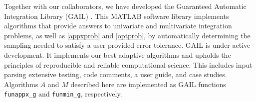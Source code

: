 \documentclass[review]{elsarticle}
\theoremstyle{definition}
\newtheorem{exmp}{Example}
\newcommand{\funappxg}{\texttt{funappx\_g}\xspace}
\newcommand{\funming}{\texttt{funmin\_g}\xspace}
\begin{document}
Together with our collaborators, we have developed the Guaranteed Automatic
Integration Library (GAIL) \cite{ChoEtal15a}. This MATLAB software library
implements algorithms that provide answers to univariate and multivariate
integration problems, as well as \eqref{appxprob} and \eqref{optprob}, by
automatically determining the sampling needed to satisfy a user provided error
tolerance. GAIL is under active development.  It implements our best adaptive algorithms and
upholds the principles of reproducible and reliable computational science.  This includes input parsing extensive testing, code comments, a user guide, and case studies.
Algorithms $A$ and $M$ described here are implemented as GAIL
functions \funappxg{} and \funming, respectively.

\begin{comment}
In computer graphics, three-dimensional objects can often be parameterized by
functions. Moreover, interpolation at low to medium accuracy is often be
sufficient for projecting satisfactory visual perceptions on devices that have
relatively limited memory and low-resolution display, for example, cell phones
and wearables. Example~6 in \cite[Chapter~3, Section~6]{Din15a} uses \funappxg{}
to interpolate the surface of a seashell, resulting in a sufficiently accurate
reconstruction in~$\mathbb{R}^3$.


\begin{figure}[tbh]
  \centering
  \begin{tabular}{cc}
     \texttt{[image: figure/funappxseashell.pdf]}
  & \texttt{[image: figure/seashellsurferror.pdf]}
  \\ a)  & b)
  \end{tabular}
\caption{a) Approximate seashell; b) Error estimation of seashell with tolerance
$0.1$. This figure is reproducible by \texttt{traub\_funappxseashell.m}.}
\label{fig:funappxseashell}
\end{figure}

\begin{exmp}
Figure~\ref{fig:funappxseashell}a) is an approximation of a
seashell portrayed as a parametric surface in 3D. Let $a=-0.2$, $b=0.5$,
$c=0.1$, $n = 2$, $u,v \in [0, 2 \pi]$, and $w(v) =
a\left(1-\frac{v}{2\pi}\right)$. The parametric surface is defined by the
following equations~\cite{DavEtal04}:
\begin{align*}
x(u,v) & =   \left[ w(v) \left(1+\cos(u)\right) + c\right]\cos(nv),\\
y(u,v) & = \left[w(v) (1+\cos(u)) + c\right] \sin(nv),\\
z(u,v) & = {bv}/{2\pi} + w(v)\sin(u).
\end{align*}
%


\end{comment}
\end{document}
